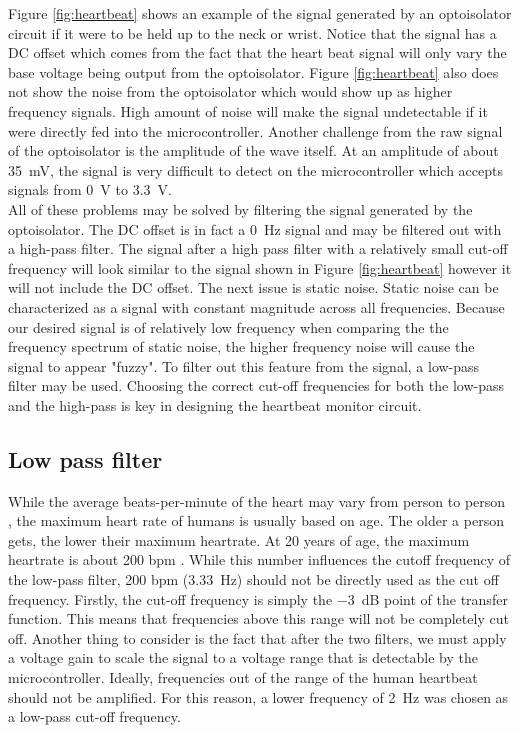 \documentclass[CMPE]{../KGCOEReport}
\begin{document}
	Figure \ref{fig:heartbeat} shows an example of the signal generated by an optoisolator
	circuit if it were to be held up to the neck or wrist. Notice that the signal has a
	DC offset which comes from the fact that the heart beat signal will only vary the
	base voltage being output from the optoisolator. Figure \ref{fig:heartbeat} also
	does not show the noise from the optoisolator which would show up as higher frequency
	signals. High amount of noise will make the signal undetectable if it were directly
	fed into the microcontroller. Another challenge from the raw signal of the optoisolator
	is the amplitude of the wave itself. At an amplitude of about \SI{35}{\milli\volt},
	the signal is very difficult to detect on the microcontroller which accepts signals
	from \SI{0}{\volt} to \SI{3.3}{\volt}. \\

	All of these problems may be solved by filtering the signal generated by the
	optoisolator. The DC offset is in fact a \SI{0}{\hertz} signal and may be filtered
	out with a high-pass filter. The signal after a high pass filter with a relatively
	small cut-off frequency will look similar to the signal shown in Figure 
	\ref{fig:heartbeat}
	however it will not include the DC offset. The next issue is static noise. Static noise
	can be characterized as a signal with constant magnitude across all frequencies.
	Because our desired signal is of relatively low frequency when comparing the the
	frequency spectrum of static noise, the higher frequency noise will cause the signal
	to appear "fuzzy". To
	filter out this feature from the signal, a low-pass filter may be used. Choosing the
	correct cut-off frequencies for both the low-pass and the high-pass is key in
	designing the heartbeat monitor circuit.\\

	\subsection*{Low pass filter}
	While the average beats-per-minute of the heart may vary from person to person
	\cite{b1}, the maximum heart rate of humans is usually based on age. The older a
	person gets, the lower their maximum heartrate. At 20 years of age, the maximum
	heartrate is about 200 bpm \cite{b2}. While this number influences the cutoff
	frequency of the low-pass filter, 200 bpm (\SI{3.33}{\hertz}) should not be directly
	used as the cut off frequency. Firstly, the cut-off frequency is simply the
	\SI{-3}{\dB} point of the transfer function. This means that frequencies above this
	range will not be completely cut off. Another thing to consider is the fact that
	after the two filters, we must apply a voltage gain to scale the signal to a voltage
	range that is detectable by the microcontroller. Ideally, frequencies out of the
	range of the human heartbeat should not be amplified. For this reason, a lower
	frequency of \SI{2}{\hertz} was chosen as a low-pass cut-off frequency.\\
\end{document}
